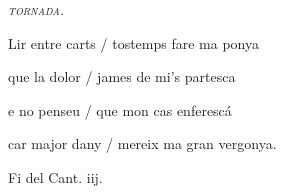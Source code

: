\documentclass[12pt]{article}
\begin{document}
\begin{estrofaExtra}%




\begin{tornada}

\pagina{[139r]} \textit{\textsc{tornada.}}

\end{tornada}


\end{estrofaExtra}


\begin{estrofa}

 Lir entre carts / tostemps fare ma ponya

 que la dolor / james de mi's partesca

 e no penseu / que mon cas enferesc\'{a}

 car major dany / mereix ma gran vergonya.

\end{estrofa}



\begin{estrofaExtra}%

\begin{final}

Fi del Cant. iij.

\end{final}

\end{estrofaExtra}
\end{document}
